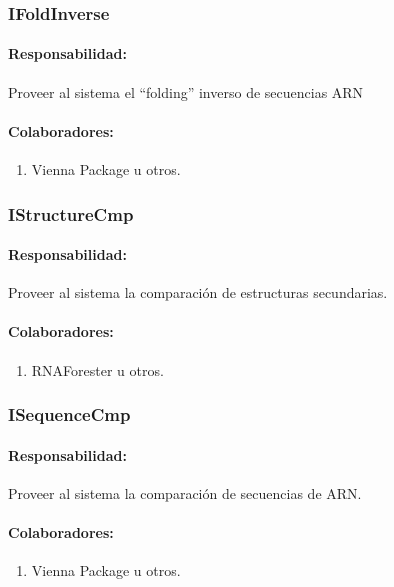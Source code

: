   \subsubsection{IFoldInverse}
    \paragraph{Responsabilidad:} Proveer al sistema el ``folding'' inverso de
secuencias ARN
    \paragraph{Colaboradores:}
      \begin{enumerate}
       \item Vienna Package u otros.
      \end{enumerate}

  \subsubsection{IStructureCmp}
    \paragraph{Responsabilidad:} Proveer al sistema la comparaci\'on de
estructuras secundarias.
    \paragraph{Colaboradores:}
      \begin{enumerate}
       \item RNAForester u otros.
      \end{enumerate}

  \subsubsection{ISequenceCmp}
    \paragraph{Responsabilidad:} Proveer al sistema la comparaci\'on de
secuencias de ARN.
    \paragraph{Colaboradores:}
      \begin{enumerate}
       \item Vienna Package u otros.
      \end{enumerate}


